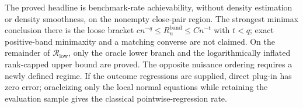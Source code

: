 The proved headline is benchmark-rate achievability, without density estimation or density smoothness, on the nonempty close-pair region.  The strongest minimax conclusion there is the loose bracket \(c n^{-q}\leq R_n^{\mathrm{band}}\leq Cn^{-t}\) with \(t<q\); exact positive-band minimaxity and a matching converse are not claimed.  On the remainder of \(\mathcal R_{\mathrm{low}}\), only the oracle lower branch and the logarithmically inflated rank-capped upper bound are proved.  The opposite nuisance ordering requires a newly defined regime.  If the outcome regressions are supplied, direct plug-in has zero error; oracleizing only the local normal equations while retaining the evaluation sample gives the classical pointwise-regression rate.